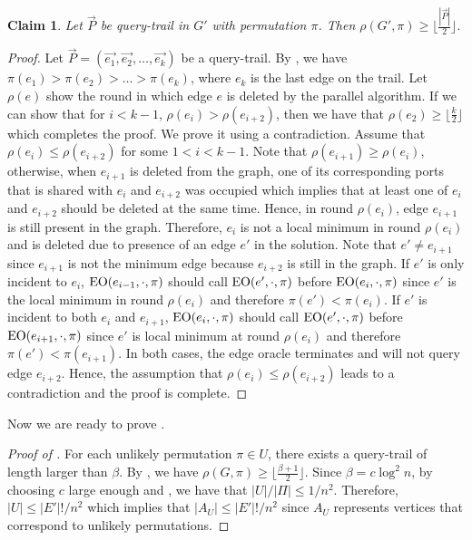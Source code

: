 \documentclass[letterpaper,11pt]{article}
\newcommand{\EO}[0]{\ensuremath{\textup{EO}}}
\newtheorem{claim}[theorem]{Claim}
\newenvironment{myproof}{
\vspace{-0.5cm}
\begin{proof}
}{
\end{proof}
}
\begin{document}
\begin{claim}\label{clm: large-round-complexity}
Let $\vec{P}$ be query-trail in $G'$ with permutation $\pi$. Then $\rho(G', \pi) \geq \lfloor \frac{|\vec{P}|}{2}\rfloor$.
\end{claim}
\begin{myproof}
Let $\vec{P} = (\vec{e_1}, \vec{e_2}, \ldots, \vec{e_k})$ be a query-trail. By , we have $\pi(e_1) > \pi(e_2) > \ldots > \pi(e_k)$, where $e_k$ is the last edge on the trail. Let $\rho(e)$ show the round in which edge $e$ is deleted by the parallel algorithm. If we can show that for $i < k - 1$, $\rho(e_i) > \rho(e_{i+2})$, then we have that $\rho(e_2) \geq \lfloor \frac{k}{2}\rfloor$ which completes the proof. We prove it using a contradiction. Assume that $\rho(e_i) \leq \rho(e_{i+2})$ for some $1 < i < k - 1$. Note that $\rho(e_{i+1}) \geq \rho(e_i)$, otherwise, when $e_{i+1}$ is deleted from the graph, one of its corresponding ports that is shared with $e_i$ and $e_{i+2}$ was occupied which implies that at least one of $e_i$ and $e_{i+2}$ should be deleted at the same time. Hence, in round $\rho(e_i)$, edge $e_{i+1}$ is still present in the graph. Therefore, $e_i$ is not a local minimum in round $\rho(e_i)$ and is deleted due to presence of an edge $e'$ in the solution. Note that $e' \neq e_{i+1}$ since $e_{i+1}$ is not the minimum edge because $e_{i+2}$ is still in the graph. If $e'$ is only incident to $e_i$, $\EO(e_{i-1}, \cdot, \pi)$ should call $\EO(e', \cdot, \pi)$ before $\EO(e_i, \cdot, \pi)$ since $e'$ is the local minimum in round $\rho(e_i)$ and therefore $\pi(e') < \pi(e_i)$. If $e'$ is incident to both $e_i$ and $e_{i+1}$, $\EO(e_i, \cdot, \pi)$ should call $\EO(e', \cdot,\pi)$ before $\EO(e_{i+1}, \cdot,\pi)$ since $e'$ is local minimum at round $\rho(e_i)$ and therefore $\pi(e') < \pi(e_{i+1})$. In both cases, the edge oracle terminates and will not query edge $e_{i+2}$. Hence, the assumption that $\rho(e_i) \leq \rho(e_{i+2})$ leads to a contradiction and the proof is complete.
\end{myproof}

Now we are ready to prove .

\begin{proof}[Proof of ]
For each unlikely permutation $\pi \in U$, there exists a query-trail of length larger than $\beta$. By , we have $\rho(G, \pi) \geq \lfloor \frac{\beta + 1}{2}\rfloor$. Since $\beta = c\log^2 n$, by choosing $c$ large enough and , we have that $|U|/|\Pi| \leq 1/n^2$. Therefore, $|U| \leq |E'|!/n^2$ which implies that $|A_U| \leq |E'|!/n^2$ since $A_U$ represents vertices that correspond to unlikely permutations.
\end{proof}
\end{document}
